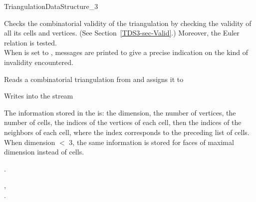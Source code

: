 \begin{ccRefConcept}{TriangulationDataStructure_3}
\begin{ccAdvanced}

{Checks the combinatorial validity of the triangulation by checking
the validity of all its cells and vertices. 
(See Section~\ref{TDS3-sec-Valid}.) Moreover, the Euler relation is
tested.\\ 
When  is set to , messages are printed to give
a precise indication on the kind of invalidity encountered.}
\end{ccAdvanced}


{Reads a combinatorial triangulation from  and assigns it to }

{Writes  into the stream }

The information stored in the  is: 
the dimension, the number of vertices, the number of cells,
the indices of the vertices of each cell, then the indices of the
neighbors of each cell, where the index corresponds to the preceding
list of cells. When dimension $<$ 3, the same information is stored
for faces of maximal dimension instead of cells.

\ccHasModels

.

\ccSeeAlso

,\\
.

\end{ccRefConcept}


